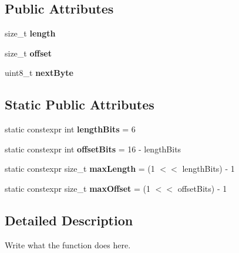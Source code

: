 \subsection*{Public Attributes}
\begin{DoxyCompactItemize}
\item 
\hypertarget{structLZ77CodeType_a1293f16ab8da36535682268031ec12a2}{size\+\_\+t {\bfseries length}}\label{structLZ77CodeType_a1293f16ab8da36535682268031ec12a2}

\item 
\hypertarget{structLZ77CodeType_a99e75c41fc2a5d36496e2eb6c675e8ce}{size\+\_\+t {\bfseries offset}}\label{structLZ77CodeType_a99e75c41fc2a5d36496e2eb6c675e8ce}

\item 
\hypertarget{structLZ77CodeType_ad5e0d80546417194466ff5300d0abc6f}{uint8\+\_\+t {\bfseries next\+Byte}}\label{structLZ77CodeType_ad5e0d80546417194466ff5300d0abc6f}

\end{DoxyCompactItemize}
\subsection*{Static Public Attributes}
\begin{DoxyCompactItemize}
\item 
\hypertarget{structLZ77CodeType_af6ddc790f261e742edf7e4c9730f2428}{static constexpr int {\bfseries length\+Bits} = 6}\label{structLZ77CodeType_af6ddc790f261e742edf7e4c9730f2428}

\item 
\hypertarget{structLZ77CodeType_a73491cf97e707f632e18d331d88c9aec}{static constexpr int {\bfseries offset\+Bits} = 16 -\/ length\+Bits}\label{structLZ77CodeType_a73491cf97e707f632e18d331d88c9aec}

\item 
\hypertarget{structLZ77CodeType_a91907290a8a919c21b5312ece5fe5eb4}{static constexpr size\+\_\+t {\bfseries max\+Length} = (1 $<$$<$ length\+Bits) -\/ 1}\label{structLZ77CodeType_a91907290a8a919c21b5312ece5fe5eb4}

\item 
\hypertarget{structLZ77CodeType_a07cb40a10cc2f689a9323c0f6533ed3c}{static constexpr size\+\_\+t {\bfseries max\+Offset} = (1 $<$$<$ offset\+Bits) -\/ 1}\label{structLZ77CodeType_a07cb40a10cc2f689a9323c0f6533ed3c}

\end{DoxyCompactItemize}


\subsection{Detailed Description}
Write what the function does here. 


